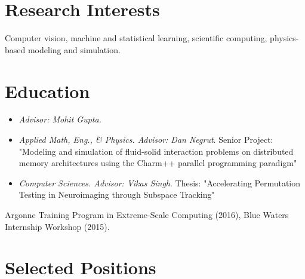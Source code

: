 \documentclass[11pt,a4paper,sans]{moderncv}        %
\begin{document}
\makecvtitle

\section{Research Interests}
Computer vision, machine and statistical learning, scientific computing, physics-based modeling and simulation.

\section{Education}
{\begin{itemize}
\item \textit{Advisor: Mohit Gupta.}
\end{itemize}}

{\begin{itemize}
\item \textit{Applied Math, Eng., \& Physics. Advisor: Dan Negrut}. Senior Project: "Modeling and simulation of fluid-solid interaction problems on distributed memory architectures using the Charm++ parallel programming paradigm"
\item \textit{Computer Sciences. Advisor: Vikas Singh}. Thesis: "Accelerating Permutation Testing in Neuroimaging through Subspace Tracking"
\end{itemize}}  %
{Argonne Training Program in Extreme-Scale Computing (2016), Blue Waters Internship Workshop (2015).}


\section{Selected Positions}
\end{document}

